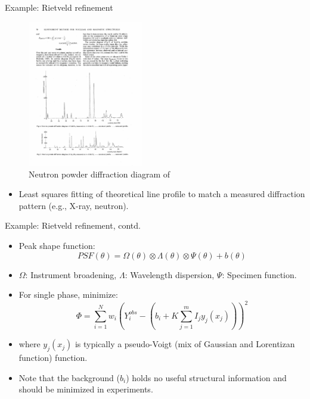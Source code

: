 \documentclass[aspectratio=169]{beamer}
\begin{document}
\begin{frame}{Example: Rietveld refinement}
\begin{figure}
    \centering
    \includegraphics[width=0.45\textwidth]{figures/rietveld.pdf}
    \caption{Neutron powder diffraction diagram of }
\end{figure}
    \begin{itemize}
        \item Least squares fitting of theoretical line profile to match a measured diffraction pattern (e.g., X-ray, neutron).\cite{rietveldProfileRefinementMethod1969}
    \end{itemize}
\end{frame} 


\begin{frame}{Example: Rietveld refinement, contd.}
    \begin{itemize}
        \item Peak shape function:
        \begin{equation*}
            PSF(\theta) = \Omega(\theta) \otimes \Lambda(\theta) \otimes \Psi(\theta) + b(\theta)
        \end{equation*}
        \item $\Omega$: Instrument broadening, $\Lambda$: Wavelength dispersion, $\Psi$: Specimen function.
        \item For single phase, minimize:
        \begin{equation*}
            \Phi = \sum_{i=1}^N w_i \left ( Y_i^{obs} - \left ( b_i + K \sum_{j=1}^m I_jy_j(x_j)\right )\right )^2
        \end{equation*}
        \item where $y_j(x_j)$ is typically a pseudo-Voigt (mix of Gaussian and Lorentizan function) function.
        \item Note that the background ($b_i$) holds no useful structural information and should be minimized in experiments.
    \end{itemize}
\end{frame} 
\end{document}
